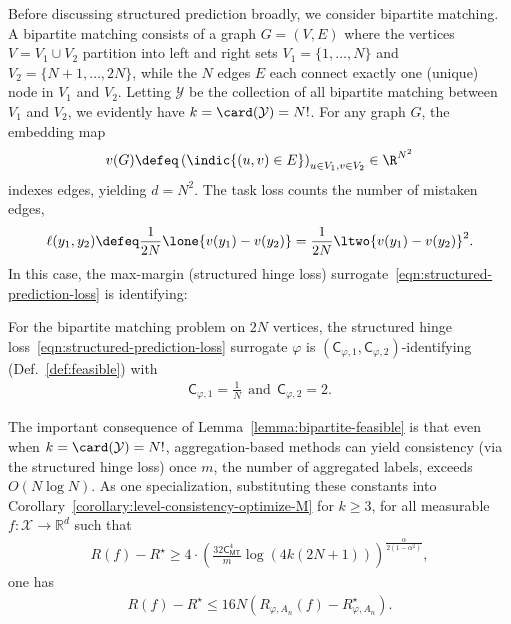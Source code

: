 \documentclass[11pt]{article}
\newcommand{\prn}[1]{\left({#1}\right)} %
\newcommand{\constant}{\mathsf{C}}  %
\newcommand{\cstMT}{\constant_{\mathsf{MT}}}
\newcommand{\sX}{\mathcal{X}} %
\newcommand{\sY}{\mathcal{Y}} %
\newcommand{\tloss}{\ell}  %
\newcommand{\sloss}{\varphi}  %
\begin{document}
Before discussing structured prediction broadly, we consider
bipartite matching.
%
A bipartite matching consists of a graph $G=(V,E)$ where the vertices $V =
V_1 \cup V_2$ partition into left and right sets $V_1 = \{1, \ldots, N\}$
and $V_2 = \{N + 1, \ldots, 2N\}$, while the $N$ edges $E$ each connect
exactly one (unique) node in $V_1$ and $V_2$.
%
Letting $\sY$ be the collection of all bipartite matching between $V_1$ and
$V_2$, we evidently have $k = \card(\sY) = N!$.
%
For any graph $G$, the embedding map
\begin{equation*}
  v(G) \defeq \left(\indic{(u,v) \in E}\right)_{u \in V_1, v \in V_2} \in \R^{N^2}
\end{equation*}
indexes edges, yielding $d = N^2$.
%
The task loss counts the number of mistaken edges,
\begin{align*}
  \tloss(y_1,y_2) \defeq \frac{1}{2N}
  \lone{v(y_1) - v(y_2)}
  = \frac{1}{2N} \ltwo{v(y_1) - v(y_2)}^2.
\end{align*}
In this case, the max-margin (structured hinge loss)
surrogate~\eqref{eqn:structured-prediction-loss}
is identifying:
\begin{lemma}
  \label{lemma:bipartite-feasible}
  For the bipartite matching problem on $2N$ vertices, the structured
  hinge loss~\eqref{eqn:structured-prediction-loss} surrogate $\sloss$ is
  $(\constant_{\sloss, 1}, \constant_{\sloss, 2})$-identifying
  (Def.~\ref{def:feasible}) with
  \begin{align*}
    \constant_{\sloss, 1} = \frac{1}{N}
    ~~ \mbox{and} ~~
    \constant_{\sloss, 2} = 2.
  \end{align*}
\end{lemma}

The important consequence of Lemma~\ref{lemma:bipartite-feasible} is that
even when $k = \card(\sY) = N!$, aggregation-based methods can yield
consistency (via the structured hinge loss) once $m$, the number of
aggregated labels, exceeds $O(N \log N)$.
%
As one specialization, substituting these constants into
Corollary~\ref{corollary:level-consistency-optimize-M} for $k \geq 3$, for all
measurable $f: \sX \to \mathbb{R}^d$ such that
\begin{align*}
  R(f) - R^\star \geq 4 \cdot  \prn{\frac{32 \cstMT^4}{m}\log \prn{ 4k (2N+1)}}^{\frac{\alpha}{2(1-\alpha^2)}},
\end{align*}
one has
\begin{align*}
  R(f) - R^\star \leq 16N (R_{\sloss,A_n}(f) - R_{\sloss,A_n}^\star).
\end{align*}
\end{document}
